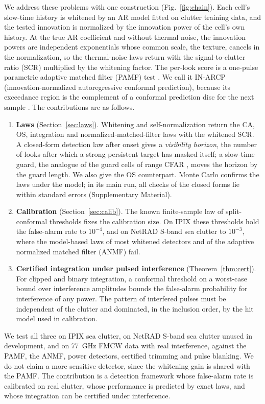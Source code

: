 \documentclass[journal]{IEEEtran}
\begin{document}
We address these problems with one construction (Fig.~\ref{fig:chain}). Each cell's slow-time history is whitened by an AR model fitted on clutter training data, and the tested innovation is normalized by the innovation power of the cell's own history. At the true AR coefficient and without thermal noise, the innovation powers are independent exponentials whose common scale, the texture, cancels in the normalization, so the thermal-noise laws return with the signal-to-clutter ratio (SCR) multiplied by the whitening factor. The per-look score is a one-pulse parametric adaptive matched filter (PAMF) test \cite{roman2000}. We call it IN-ARCP (innovation-normalized autoregressive conformal prediction), because its exceedance region is the complement of a conformal prediction disc for the next sample \cite{lei2018}. The contributions are as follows.
\begin{enumerate}[leftmargin=*,itemsep=2pt]
\item \textbf{Laws} (Section~\ref{sec:laws}). Whitening and self-normalization return the CA, OS, integration and normalized-matched-filter laws with the whitened SCR. A closed-form detection law after onset gives a \emph{visibility horizon}, the number of looks after which a strong persistent target has masked itself; a slow-time guard, the analogue of the guard cells of range CFAR \cite{richards2014}, moves the horizon by the guard length. We also give the OS counterpart. Monte Carlo confirms the laws under the model; in its main run, all \NLawChecks{} checks of the closed forms lie within \LawChecksZBound{} standard errors (Supplementary Material).
\item \textbf{Calibration} (Section~\ref{sec:calib}). The known finite-sample law of split-conformal thresholds \cite{vovk2012} fixes the calibration size. On IPIX these thresholds hold the false-alarm rate to $10^{-4}$, and on NetRAD S-band sea clutter to $10^{-3}$, where the model-based laws of most whitened detectors and of the adaptive normalized matched filter (ANMF) fail.
\item \textbf{Certified integration under pulsed interference} (Theorem~\ref{thm:cert}). For clipped \cite{abbasi2018clip} and binary integration, a conformal threshold on a worst-case bound over interference amplitudes bounds the false-alarm probability for interference of any power. The pattern of interfered pulses must be independent of the clutter and dominated, in the inclusion order, by the hit model used in calibration.
\end{enumerate}
We test all three on IPIX sea clutter, on NetRAD S-band sea clutter unused in development, and on 77~GHz FMCW data with real interference, against the PAMF, the ANMF, power detectors, certified trimming and pulse blanking. We do not claim a more sensitive detector, since the whitening gain is shared with the PAMF. The contribution is a detection framework whose false-alarm rate is calibrated on real clutter, whose performance is predicted by exact laws, and whose integration can be certified under interference.
\end{document}
